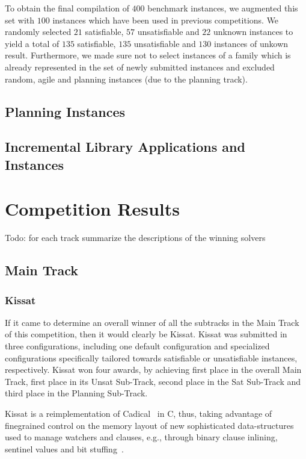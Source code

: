 \documentclass{elsarticle}
\newcommand{\todo}[1]{{\color{purple}Todo: #1}}
\begin{document}
To obtain the final compilation of $400$ benchmark instances, we augmented this set with $100$ instances which have been used in previous competitions. 
We randomly selected $21$ satisfiable, $57$ unsatisfiable and $22$ unknown instances to yield a total of $135$ satisfiable, $135$ unsatisfiable and $130$ instances of unkown result. 
Furthermore, we made sure not to select instances of a family which is already represented in the set of newly submitted instances and excluded random, agile and planning instances (due to the planning track). 


\subsection{Planning Instances}

\subsection{Incremental Library Applications and Instances}


\section{Competition Results}
\label{sec:results}
\todo{for each track summarize the descriptions of the winning solvers}

\subsection{Main Track}

\subsubsection{Kissat} 

If it came to determine an overall winner of all the subtracks in the Main Track of this competition, then it would clearly be Kissat. 
Kissat was submitted in three configurations, including one default configuration and specialized configurations specifically tailored towards satisfiable or unsatisfiable instances, respectively.
Kissat won four awards, by achieving first place in the overall Main Track, first place in its Unsat Sub-Track, second place in the Sat Sub-Track and third place in the Planning Sub-Track. 

Kissat is a reimplementation of Cadical~\cite{} in C, thus, taking advantage of finegrained control on the memory layout of new sophisticated data-structures used to manage watchers and clauses, e.g., through binary clause inlining, sentinel values and bit stuffing~\cite{}. 
\end{document}
